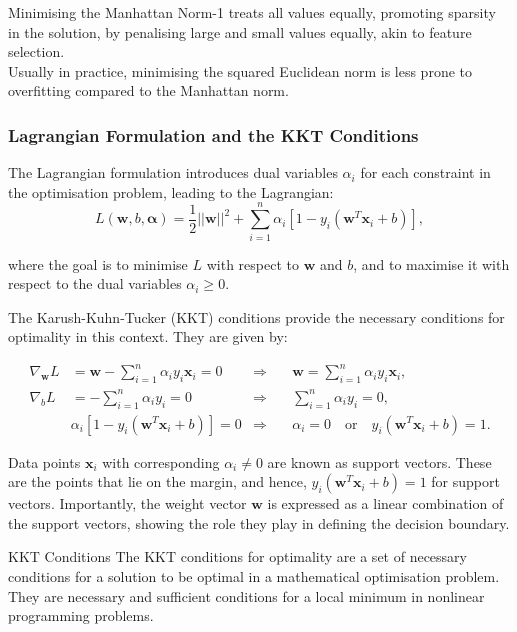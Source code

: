 Minimising the Manhattan Norm-1 treats all values equally, promoting sparsity in the solution, by penalising large and small values equally, akin to feature selection. \\

Usually in practice, minimising the squared Euclidean norm is less prone to overfitting compared to the Manhattan norm.

\subsubsection*{Lagrangian Formulation and the KKT Conditions}
The Lagrangian formulation introduces dual variables \( \alpha_i \) for each constraint in the optimisation problem, leading to the Lagrangian:
\[
L(\mathbf{w}, b, \boldsymbol{\alpha}) = \frac{1}{2}||\mathbf{w}||^2 + \sum_{i=1}^n \alpha_i[1 - y_i(\mathbf{w}^T \mathbf{x}_i + b)],
\]

where the goal is to minimise \( L \) with respect to \( \mathbf{w} \) and \( b \), and to maximise it with respect to the dual variables \( \alpha_i \geq 0 \).

The Karush-Kuhn-Tucker (KKT) conditions provide the necessary conditions for optimality in this context. They are given by:

\begin{align*}
\nabla_{\mathbf{w}}L &= \mathbf{w} - \sum_{i=1}^n \alpha_i y_i \mathbf{x}_i = 0  &\Rightarrow & \quad \mathbf{w} = \sum_{i=1}^n \alpha_i y_i \mathbf{x}_i, \\
\nabla_{b}L &= -\sum_{i=1}^n \alpha_i y_i = 0  &\Rightarrow & \quad \sum_{i=1}^n \alpha_i y_i = 0, \\
&\alpha_i[1 - y_i(\mathbf{w}^T \mathbf{x}_i + b)] = 0  &\Rightarrow & \quad \alpha_i = 0 \quad \text{or} \quad y_i(\mathbf{w}^T \mathbf{x}_i + b) = 1.
\end{align*}

Data points \( \mathbf{x}_i \) with corresponding \( \alpha_i \neq 0 \) are known as support vectors. These are the points that lie on the margin, and hence, \( y_i(\mathbf{w}^T \mathbf{x}_i + b) = 1 \) for support vectors. Importantly, the weight vector \( \mathbf{w} \) is expressed as a linear combination of the support vectors, showing the role they play in defining the decision boundary.

\begin{commentbox}{KKT Conditions}
The KKT conditions for optimality are a set of necessary conditions for a solution to be optimal in a mathematical optimisation problem. They are necessary and sufficient conditions for a local minimum in nonlinear programming problems.
\end{commentbox}

